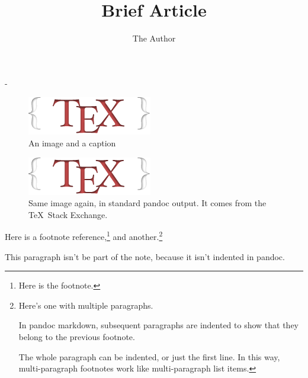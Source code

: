 \documentclass[twoside]{article}
\title{Brief Article}
\author{The Author}
\newif\ifduplex
\newlength{\overhang}
\newenvironment{fullwidth}{%
  \begin{adjustwidth\ifduplex*\fi}{}{-\overhang}}{%
  \end{adjustwidth\ifduplex*\fi}}
\begin{document}
\maketitle

\lipsum[1]

\begin{fullwidth}
  \begin{multicols}{2}
    \lipsum[2]
  \end{multicols}
  \begin{figure}[htbp]
    \centering
    \includegraphics{./logo.png}
    \caption{An image and a caption}
  \end{figure}
\end{fullwidth}

\lipsum[3-4]

\begin{figure}[htbp]
\centering
\includegraphics{./logo.png}
\caption{Same image again, in standard pandoc output. It comes from the \TeX\ Stack Exchange.}
\end{figure}

\lipsum[5]

Here is a footnote reference,\footnote{Here is the footnote.} and
another.\footnote{Here's one with multiple paragraphs.

  In pandoc markdown, subsequent paragraphs are indented to show
  that they belong to the previous footnote.

  The whole paragraph can be indented, or just the first line. In this
  way, multi-paragraph footnotes work like multi-paragraph list items.}

This paragraph isn't be part of the note, because it isn't indented in pandoc.
\end{document}
